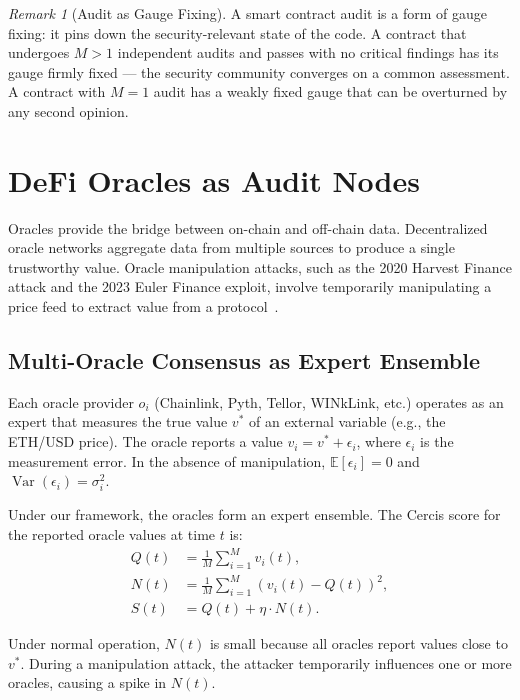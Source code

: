 \documentclass[12pt,a4paper]{article}
\theoremstyle{remark}
\newtheorem{remark}[theorem]{Remark}
\newcommand{\E}{\mathbb{E}}
\newcommand{\Cercis}{\textsf{Cercis}}
\DeclareMathOperator{\Var}{Var}
\begin{document}
\begin{remark}[Audit as Gauge Fixing]
A smart contract audit is a form of gauge fixing: it pins down the
security-relevant state of the code. A contract that undergoes $M>1$
independent audits and passes with no critical findings has its gauge firmly
fixed --- the security community converges on a common assessment.
A contract with $M=1$ audit has a weakly fixed gauge that can be overturned
by any second opinion.
\end{remark}

\section{DeFi Oracles as Audit Nodes}
\label{sec:oracle}

Oracles provide the bridge between on-chain and off-chain data. Decentralized
oracle networks aggregate data from multiple sources to produce a single
trustworthy value. Oracle manipulation attacks, such as the 2020 Harvest
Finance attack and the 2023 Euler Finance exploit, involve temporarily
manipulating a price feed to extract value from a protocol~\cite{zhou2023oracle}.

\subsection{Multi-Oracle Consensus as Expert Ensemble}

Each oracle provider $o_i$ (Chainlink, Pyth, Tellor, WINkLink, etc.) operates
as an expert that measures the true value $v^*$ of an external variable (e.g.,
the ETH/USD price). The oracle reports a value $v_i = v^* + \epsilon_i$, where
$\epsilon_i$ is the measurement error. In the absence of manipulation,
$\E[\epsilon_i] = 0$ and $\Var(\epsilon_i) = \sigma_i^2$.

Under our framework, the oracles form an expert ensemble. The \Cercis{} score
for the reported oracle values at time $t$ is:
\begin{align}
Q(t) &= \frac{1}{M} \sum_{i=1}^M v_i(t), \label{eq:oracle_q} \\
N(t) &= \frac{1}{M} \sum_{i=1}^M (v_i(t) - Q(t))^2, \label{eq:oracle_n} \\
S(t) &= Q(t) + \eta \cdot N(t). \label{eq:oracle_s}
\end{align}

Under normal operation, $N(t)$ is small because all oracles report values
close to $v^*$. During a manipulation attack, the attacker temporarily
influences one or more oracles, causing a spike in $N(t)$.
\end{document}
